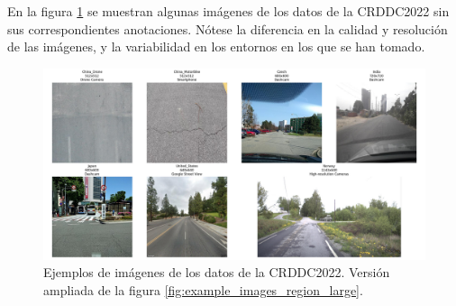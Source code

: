 En la figura \ref{fig:example_images_region} se muestran algunas imágenes de los datos de la CRDDC2022 sin sus correspondientes anotaciones. Nótese la diferencia en la calidad y resolución de las imágenes, y la variabilidad en los entornos en los que se han tomado.

\begin{figure}[H]
    \centering
    \includegraphics[width=1\textwidth]{img/example_images_regions.png}
    \caption{Ejemplos de imágenes de los datos de la CRDDC2022. Versión ampliada de la figura \ref{fig:example_images_region_large}.}
    \label{fig:example_images_region}
\end{figure}